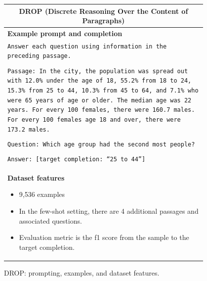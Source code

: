 \documentclass{article}
\begin{document}
\begin{figure}[p]
    \centering
    \small
    \begin{tabular}{p{0.95\linewidth}}
    \toprule
    \multicolumn{1}{c}{\textbf{DROP (Discrete Reasoning Over the Content of Paragraphs)}} \\
    \midrule
    \textbf{Example prompt and completion}  \\
    \texttt{Answer each question using information in the preceding passage.}  \\\\
    \texttt{Passage: In the city, the population was spread out with 12.0\% under the age of 18, 55.2\% from 18 to 24, 15.3\% from 25 to 44, 10.3\% from 45 to 64, and 7.1\% who were 65 years of age or older. The median age was 22 years. For every 100 females, there were 160.7 males. For every 100 females age 18 and over, there were 173.2 males.}  \\\\
    \texttt{Question: Which age group had the second most people?}  \\\\
    \texttt{Answer: [target completion: ``25 to 44'']}  \\

    \midrule
    \textbf{Dataset features}
    \begin{itemize}
        \item 9,536 examples
        \item In the few-shot setting, there are 4 additional passages and associated questions.
        \item Evaluation metric is the f1 score from the sample to the target completion.
    \end{itemize} \\

    \bottomrule
    \end{tabular}
    \caption{DROP: prompting, examples, and dataset features.}
    \label{tab:prompt-drop}
\end{figure}
\end{document}
